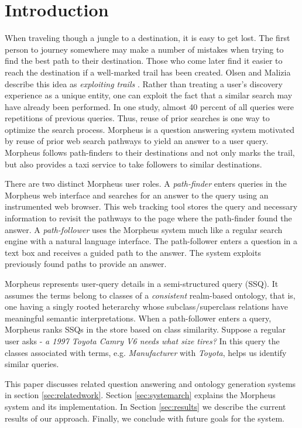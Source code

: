 \section{Introduction}



When traveling though a jungle to a destination, it is easy to get lost.  The first person to journey somewhere may make a number of mistakes when trying to find the best path to their destination. Those who come later find it easier to reach the destination if a well-marked trail has been created. Olsen and Malizia describe this idea as \emph{exploiting trails} \cite{5379671}.  Rather than treating a user's discovery experience as a unique entity, one can exploit the fact that a similar search may have already been performed.  In one study, almost 40 percent of all queries were repetitions of previous queries\cite{1277770}. Thus, reuse of prior searches is one way to optimize the search
process.  Morpheus is a question answering system motivated by reuse of prior web search pathways to yield an answer to a user query. Morpheus follows path-finders to their destinations and not only marks the trail, but also provides a taxi service to take followers to similar
destinations.

There are two distinct Morpheus user roles. A
\textit{path-finder} enters queries in the Morpheus web interface and
searches for an answer to the query using an instrumented web browser. 
This web tracking tool stores the query
and necessary information to revisit the pathways to the page where the path-finder 
found the answer. A \textit{path-follower} uses the Morpheus system much like a regular search engine with a natural language interface. The path-follower enters a question in a text box and receives a guided path to the answer. The system exploits previously found paths to provide an answer.

Morpheus represents user-query details in a semi-structured query (SSQ). It assumes the terms belong to classes of a \textit{consistent} realm-based ontology, that is, one having a singly rooted heterarchy whose subclass/superclass relations have meaningful semantic interpretations. When a path-follower enters a query, Morpheus ranks SSQs in the store based on class similarity. Suppose a regular user asks -\textit{ a 1997 Toyota Camry V6 needs what size tires?} In this query the classes associated with terms, e.g. \emph{Manufacturer} with \emph{Toyota}, helps us identify similar queries.


This paper discusses related question answering and ontology generation systems in section \ref{sec:relatedwork}. Section \ref{sec:systemarch} explains the Morpheus system and its implementation. In Section \ref{sec:results} we describe the current results of our approach.  Finally, we conclude with future goals for the system.
